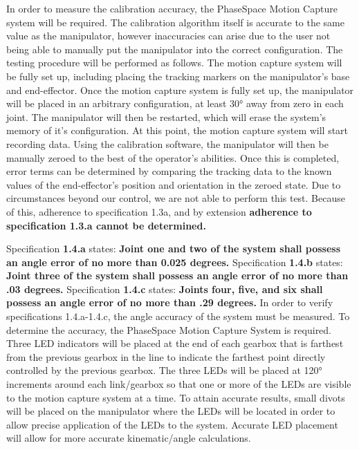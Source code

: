 In order to measure the calibration accuracy, the PhaseSpace Motion Capture system will be required. The calibration algorithm itself is accurate to the same value as the manipulator, however inaccuracies can arise due to the user not being able to manually put the manipulator into the correct configuration.  The testing procedure will be performed as follows. The motion capture system will be fully set up, including placing the tracking markers on the manipulator’s base and end-effector. Once the motion capture system is fully set up, the manipulator will be placed in an arbitrary configuration, at least 30° away from zero in each joint. The manipulator will then be restarted, which will erase the system’s memory of it’s configuration. At this point, the motion capture system will start recording data. Using the calibration software, the manipulator will then be manually zeroed to the best of the operator’s abilities. Once this is completed, error terms can be determined by comparing the tracking data to the known values of the end-effector’s position and orientation in the zeroed state. Due to circumstances beyond our control, we are not able to perform this test. Because of this, adherence to specification 1.3a, and by extension \textbf{adherence to specification 1.3.a cannot be determined.}


Specification \textbf{1.4.a} states: \textbf{Joint one and two of the system shall possess an angle error of no more than 0.025 degrees.} Specification \textbf{1.4.b} states: \textbf{Joint three of the system shall possess an angle error of no more than .03 degrees.} Specification \textbf{1.4.c} states: \textbf{Joints four, five, and six shall possess an angle error of no more than .29 degrees.} In order to verify specifications 1.4.a-1.4.c, the angle accuracy of the system must be measured. To determine the accuracy, the PhaseSpace Motion Capture System is required. Three LED indicators will be placed at the end of each gearbox that is farthest from the previous gearbox in the line to indicate the farthest point directly controlled by the previous gearbox. The three LEDs will be placed at 120° increments around each link/gearbox so that one or more of the LEDs are visible to the motion capture system at a time. To attain accurate results, small divots will be placed on the manipulator where the LEDs will be located in order to allow precise application of the LEDs to the system. Accurate LED placement will allow for more accurate kinematic/angle calculations.

